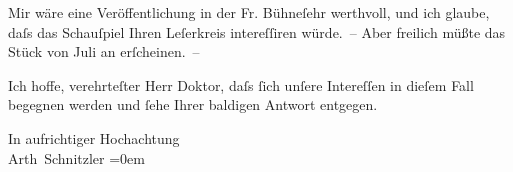\pstart
           Mir wäre eine Veröffentlichung in der Fr. Bühneſehr werthvoll, und ich glaube, daſs das Schauſpiel
               Ihren Leſerkreis intereſſiren {\pb}würde. – Aber freilich müßte
               das Stück von Juli an erſcheinen. –\pend
           
\pstart
           Ich hoffe, verehrteſter Herr Doktor, daſs ſich unſere Intereſſen in dieſem Fall
               begegnen werden und ſehe Ihrer baldigen Antwort entgegen.\pend
           
\pstart
           In aufrichtiger Hochachtung{\\[\baselineskip]}\spacefill\mbox{Arth Schnitzler}\pend
           \leftskip=0em{}\endnumbering{}  
      